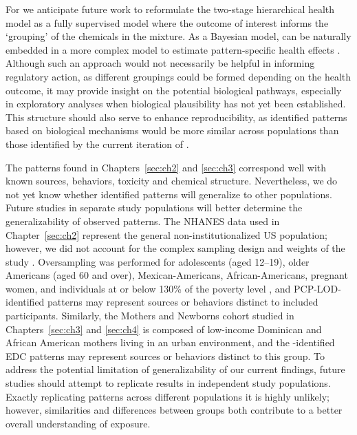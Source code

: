 For \bnmf we anticipate future work to reformulate the two-stage hierarchical health model as a fully supervised model where the outcome of interest informs the `grouping' of the chemicals in the mixture. As a Bayesian model, \bnmf can be naturally embedded in a more complex model to estimate pattern-specific health effects \citep{bda3}. Although such an approach would not necessarily be helpful in informing regulatory action, as different groupings could be formed depending on the health outcome, it may provide insight on the potential biological pathways, especially in exploratory analyses when biological plausibility has not yet been established. This structure should also serve to enhance reproducibility, as identified patterns based on biological mechanisms would be more similar across populations than those identified by the current iteration of \bnmfc.

The patterns found in Chapters~\ref{sec:ch2} and \ref{sec:ch3} correspond well with known sources, behaviors, toxicity and chemical structure. Nevertheless, we do not yet know whether identified patterns will generalize to other populations. Future studies in separate study populations will better determine the generalizability of observed patterns. The NHANES data used in Chapter~\ref{sec:ch2} represent the general non-institutionalized US population; however, we did not account for the complex sampling design and weights of the study \citep{johnson2013national}. Oversampling was performed for adolescents (aged 12–19), older Americans (aged 60 and over), Mexican-Americans, African-Americans, pregnant women, and individuals at or below 130\% of the poverty level \citep{curtin2012national}, and PCP-LOD-identified patterns may represent sources or behaviors distinct to included participants. Similarly, the Mothers and Newborns cohort studied in Chapters~\ref{sec:ch3} and \ref{sec:ch4} is composed of low-income Dominican and African American mothers living in an urban environment, and the \bnmfc-identified EDC patterns may represent sources or behaviors distinct to this group. To address the potential limitation of generalizability of our current findings, future studies should attempt to replicate results in independent study populations. Exactly replicating patterns across different populations it is highly unlikely; however, similarities and differences between groups both contribute to a better overall understanding of exposure.

